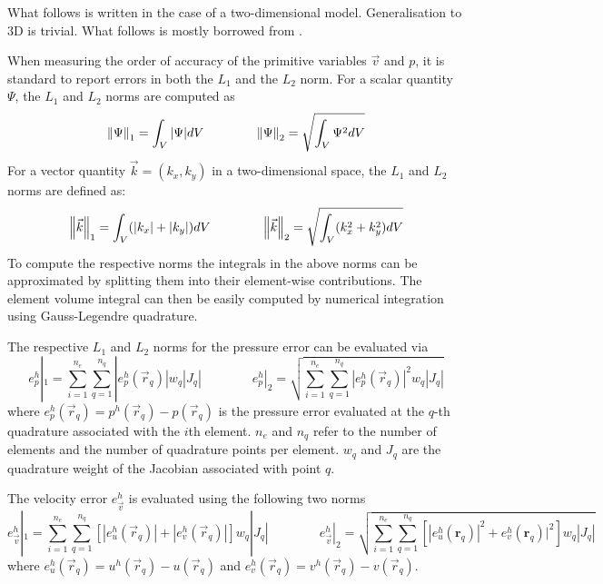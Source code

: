 
What follows is written in the case of a two-dimensional model. Generalisation to
3D is trivial. What follows is mostly borrowed from \cite{thmk14}.

When measuring the order of accuracy of the primitive variables $\vec{v}$ and $p$,
it is standard to report errors in both the $L_1$ and the $L_2$ norm.
For a scalar quantity $\Psi$, the $L_1$ and $L_2$ norms are computed as
\begin{equation}
\left\lVert\Psi\right\rVert_1 = \int_V |\Psi| dV
\quad\quad
\quad\quad
\left\lVert\Psi\right\rVert_2 = \sqrt{ \int_V \Psi^2 dV }
\end{equation}
For a vector quantity $\vec{k}=(k_x,k_y)$ in a two-dimensional space,
the $L_1$ and $L_2$ norms are defined as:
\begin{equation}
\left\lVert\vec{k}\right\rVert_1 = \int_V (|k_x|+|k_y|) dV
\quad\quad
\quad\quad
\left\lVert\vec{k}\right\rVert_2 = \sqrt{ \int_V (k_x^2+k_y^2) dV }
\end{equation}
To compute the respective norms
the integrals in the above norms can be approximated by splitting them
into their element-wise contributions. The element volume integral can then
be easily computed by numerical integration using Gauss-Legendre quadrature.

The respective $L_1$ and $L_2$ norms for the pressure error can be evaluated via
\begin{equation}
e_p^h|_1 = \sum_{i=1}^{n_e} \sum_{q=1}^{n_q} |e_p^h(\vec{r}_q)| w_q |J_q|
\quad\quad
\quad\quad
e_p^h|_2=\sqrt{ \sum_{i=1}^{n_e} \sum_{q=1}^{n_q} |e_p^h(\vec{r}_q)|^2 w_q |J_q| }
\end{equation}
where $e_p^h(\vec{r}_q)=p^h(\vec{r}_q) - p(\vec{r}_q)$ 
is the pressure error evaluated at the $q$-th quadrature associated with
the $i$th element. $n_e$ and $n_q$ refer to the number of elements and
the number of quadrature points per element.
$w_q$ and $J_q$ are the quadrature weight of the Jacobian associated with
point $q$.

The velocity error $e_{\vec v}^h$ is evaluated using the following two norms
\begin{equation}
e_{\vec{v}}^h|_1 = \sum_{i=1}^{n_e} \sum_{q=1}^{n_q} [ |e_u^h(\vec{r}_q)| + |e_v^h(\vec{r}_q)| ]    w_q |J_q|
\quad\quad
\quad\quad
e_{\vec v}^h|_2=\sqrt{ \sum_{i=1}^{n_e} \sum_{q=1}^{n_q} \left[ |e_u^h({\bm r}_q)|^2 +  e_v^h({\bm r}_q)|^2 \right] w_q |J_q| }
\end{equation}
where $e_u^h(\vec{r}_q)=u^h(\vec{r}_q) - u(\vec{r}_q)$ and $e_v^h(\vec{r}_q)=v^h(\vec{r}_q)-v(\vec{r}_q)$.


